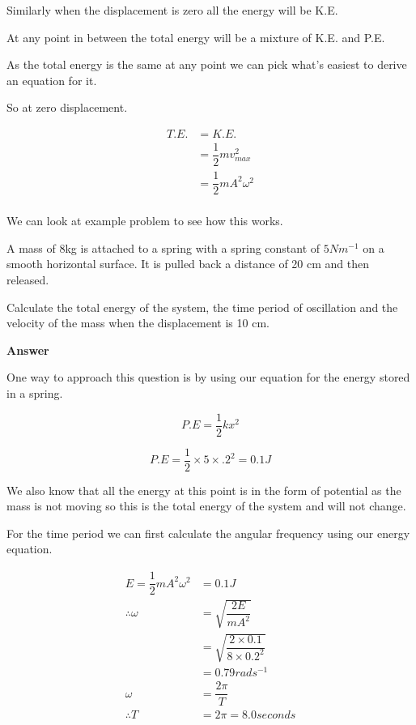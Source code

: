 \documentclass[revision-guide.tex]{subfiles}
\begin{document}
Similarly when the displacement is zero all the energy will be K.E.

At any point in between the total energy will be a mixture of K.E. and P.E. 

As the total energy is the same at any point we can pick what's easiest to derive an equation for it.

So at zero displacement.

\begin{align*} 
T.E. &= K.E. \\
&= \dfrac{1}{2}mv_{max}^2 \\
&= \dfrac{1}{2}mA^2\omega^2 \\
\end{align*}


We can look at example problem to see how this works.


\begin{example}

A mass of 8kg is attached to a spring with a spring constant of $5 Nm^{-1}$ on a smooth horizontal surface.
It is pulled back a distance of 20 cm and then released. 

Calculate the total energy of the system, the time period of oscillation and the velocity of the mass when the displacement is 10 cm.


\end{example}





    
\textbf{Answer}

One way to approach this question is by using our equation for the energy stored in a spring.

\[
P.E = \dfrac{1}{2}kx^2
\]

\[
P.E = \dfrac{1}{2} \times 5 \times .2^2 = 0.1J
\]

We also know that all the energy at this point is in the form of potential as the mass is not moving so this is the total energy of the system and will not change.



For the time period we can first calculate the angular frequency using our energy equation.

\begin{align*} 
E = \dfrac{1}{2}mA^2\omega^2 &= 0.1 J\\
\therefore \omega &= \sqrt{\dfrac{2 E}{m A^2}}\\
&= \sqrt{\dfrac{2 \times 0.1}{8 \times 0.2^2}}\\
&= 0.79 rads^{-1}\\
\omega &= \dfrac{2 \pi}{T} \\
\therefore T &= 2 \pi = 8.0 seconds \\
\end{align*}
\end{document}
